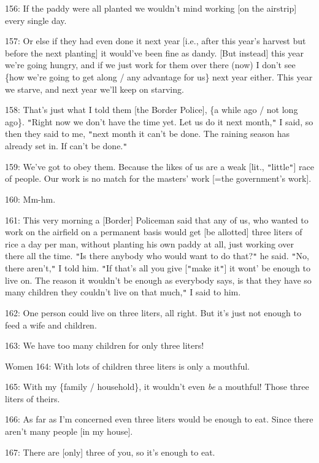 156: If the paddy were all planted we wouldn't mind working [on the airstrip] every
single day.

157: Or else if they had even done it next year [i.e., after this year's harvest
but before the next planting] it would've been fine as dandy. [But instead] this
year we're going hungry, and if we just work for them over there (now) I don't
see \{how we're going to get along / any advantage for us\} next year either. This
year we starve, and next year we'll keep on starving.

158: That's just what I told them [the Border Police], \{a while ago / not long
ago\}. \texttt{"}Right now we don't have the time yet. Let us do it next month,\texttt{"}
I said, so then they said to me, \texttt{"}next month it can't be done. The raining
season has already set in. If can't be done.\texttt{"}

159: We've got to obey them. Because the likes of us are a weak [lit., \texttt{"}little\texttt{"}]
race of people. Our work is no match for the masters' work [=the government's work].

160: Mm-hm.

161: This very morning a [Border] Policeman said that any of us, who wanted to
work on the airfield on a permanent basis would get [be allotted] three liters
of rice a day per man, without planting his own paddy at all, just working over
there all the time. \texttt{"}Is there anybody who would want to do that?\texttt{"}
he said. \texttt{"}No, there aren't,\texttt{"} I told him. \texttt{"}If that's
all you give [\texttt{"}make it\texttt{"}] it wont' be enough to live on. The reason
it wouldn't be enough as everybody says, is that they have so many children they
couldn't live on that much,\texttt{"} I said to him.

162: One person could live on three liters, all right. But it's just not enough
to feed a wife and children.

163: We have too many children for only three liters!

Women 164: With lots of children three liters is only a mouthful.

165: With my \{family / household\}, it wouldn't even \textit{be} a mouthful! Those
three liters of theirs.

166: As far as I'm concerned even three liters would be enough to eat. Since there
aren't many people [in my house].

167: There are [only] three of you, so it's enough to eat.

